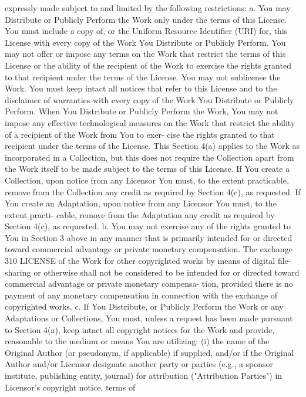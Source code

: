 \documentclass[oneside]{book}
\begin{document}
expressly made subject to and limited by the following restrictions: a. You may
Distribute or Publicly Perform the Work only under the terms of this
License. You must include a copy of, or the Uniform Resource Identifier (URI)
for, this License with every copy of the Work You Distribute or Publicly
Perform. You may not offer or impose any terms on the Work that restrict the
terms of this License or the ability of the recipient of the Work to exercise
the rights granted to that recipient under the terms of the License. You may not
sublicense the Work. You must keep intact all notices that refer to this License
and to the disclaimer of warranties with every copy of the Work You Distribute
or Publicly Perform. When You Distribute or Publicly Perform the Work, You may
not impose any effective technological measures on the Work that restrict the
ability of a recipient of the Work from You to exer- cise the rights granted to
that recipient under the terms of the License. This Section 4(a) applies to the
Work as incorporated in a Collection, but this does not require the Collection
apart from the Work itself to be made subject to the terms of this License. If
You create a Collection, upon notice from any Licensor You must, to the extent
practicable, remove from the Collection any credit as required by Section 4(c),
as requested. If You create an Adaptation, upon notice from any Licensor You
must, to the extent practi- cable, remove from the Adaptation any credit as
required by Section 4(c), as requested.  b. You may not exercise any of the
rights granted to You in Section 3 above in any manner that is primarily
intended for or directed toward commercial advantage or private monetary
compensation. The exchange 310 LICENSE of the Work for other copyrighted works
by means of digital file-sharing or otherwise shall not be considered to be
intended for or directed toward commercial advantage or private monetary
compensa- tion, provided there is no payment of any monetary compensation in
connection with the exchange of copyrighted works.  c. If You Distribute, or
Publicly Perform the Work or any Adaptations or Collections, You must, unless a
request has been made pursuant to Section 4(a), keep intact all copyright
notices for the Work and provide, reasonable to the medium or means You are
utilizing: (i) the name of the Original Author (or pseudonym, if applicable) if
supplied, and/or if the Original Author and/or Licensor designate another party
or parties (e.g., a sponsor institute, publishing entity, journal) for
attribution ("Attribution Parties") in Licensor's copyright notice, terms of
\end{document}
